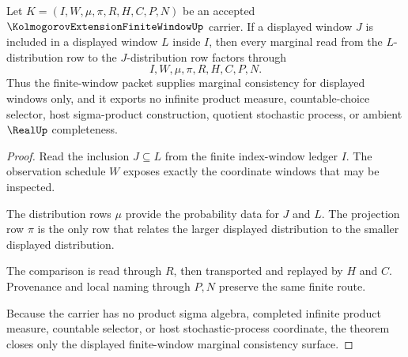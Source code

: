 \begin{theorem}
\label{thm:kolmogorov-extension-finite-window-marginal-consistency}
Let $K=(I,W,\mu,\pi,R,H,C,P,N)$ be an accepted $\KolmogorovExtensionFiniteWindowUp$ carrier. If a displayed window $J$ is included in a displayed window $L$ inside $I$, then every marginal read from the $L$-distribution row to the $J$-distribution row factors through
$$
I,W,\mu,\pi,R,H,C,P,N .
$$
Thus the finite-window packet supplies marginal consistency for displayed windows only, and it exports no infinite product measure, countable-choice selector, host sigma-product construction, quotient stochastic process, or ambient $\RealUp$ completeness.
\end{theorem}
\begin{proof}
Read the inclusion $J\subseteq L$ from the finite index-window ledger $I$. The observation schedule $W$ exposes exactly the coordinate windows that may be inspected.

The distribution rows $\mu$ provide the probability data for $J$ and $L$. The projection row $\pi$ is the only row that relates the larger displayed distribution to the smaller displayed distribution.

The comparison is read through $R$, then transported and replayed by $H$ and $C$. Provenance and local naming through $P,N$ preserve the same finite route.

Because the carrier has no product sigma algebra, completed infinite product measure, countable selector, or host stochastic-process coordinate, the theorem closes only the displayed finite-window marginal consistency surface.
\end{proof}




